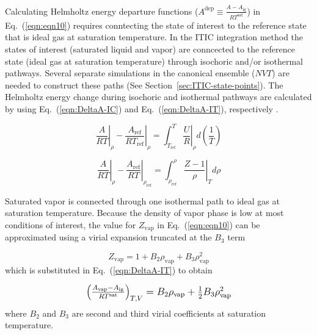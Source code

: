 \documentclass[5p,times]{elsarticle}
\begin{document}
Calculating Helmholtz energy departure functions ($A^\mathrm{dep} \equiv \frac{A-A_\mathrm{ig}}{RT^\mathrm{sat}}$) in Eq.~(\ref{eqn:eqn10}) requires conntecting the state of interest to the reference state that is ideal gas at saturation temperature. In the ITIC integration method the states of interest (saturated liquid and vapor) are conncected to the reference state (ideal gas at saturation temperature) through isochoric and/or isothermal pathways. Several separate simulations in the canonical ensemble ($NVT$) are needed to construct these paths (See Section~\ref{sec:ITIC-state-points}). The Helmholtz energy change during isochoric and isothermal pathways are calculated by using Eq.~(\ref{eqn:DeltaA-IC}) and Eq.~(\ref{eqn:DeltaA-IT}), respectively \cite{Elliott1999}.

\begin{equation}
\left. \frac{A}{RT} \right\vert_{\rho}  -  \left. \frac{A_\mathrm{ref}}{RT_\mathrm{ref}} \right\vert_{\rho} = \int _{T_\mathrm{ref}}^{T} \left.\frac{U}{R} \right\vert_{\rho} d\left(\frac{1}{T}\right)
\label{eqn:DeltaA-IC}
\end{equation}


\begin{equation}
\left.\frac{A}{RT}\right\vert_\rho-\left.\frac{A_\mathrm{ref}}{RT}\right\vert_{\rho_\mathrm{ref}} = \int _{\rho_\mathrm{ref}}^{\rho}\left.\frac{Z-1}{\rho}\right\vert_T d\rho
\label{eqn:DeltaA-IT}
\end{equation}

Saturated vapor is connected through one isothermal path to ideal gas at saturation temperature. Because the density of vapor phase is low at most conditions of interest, the value for $Z_{\mathrm{vap}}$ in Eq.~(\ref{eqn:eqn10}) can be approximated using a virial expansion truncated at the $B_3$ term

\begin{equation}
{Z_{\mathrm{vap}}} = 1 + {B_2}{\rho_{\mathrm{vap}}} + {B_3}\rho_{\mathrm{vap}}^2
\label{eqn:eqn11}
\end{equation}
which is substituted in Eq.~(\ref{eqn:DeltaA-IT}) to obtain

\begin{equation}
\begingroup
\large
\begin{array}{l}{\left( {\frac{{{A_\mathrm{vap}} - {A_\mathrm{ig}}}}{{RT^\mathrm{sat}}}} \right)_{T,V}} =  {B_2}{\rho _{\mathrm{vap}}} + \frac{1}{2}{B_3}\rho _{\mathrm{vap}}^2
\\ 
\end{array} 
\endgroup
\label{eqn:eqn12}
\end{equation}
where $B_2$ and $B_3$ are second and third virial coefficients at saturation temperature.
\end{document}
